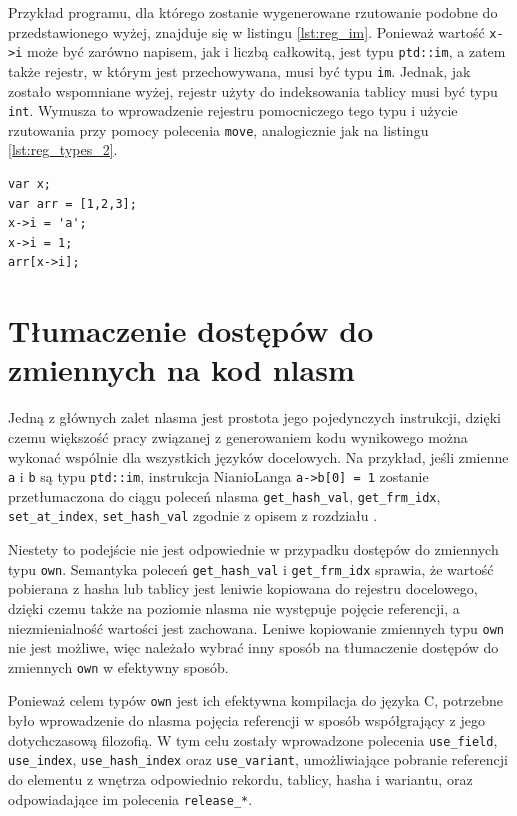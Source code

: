 \documentclass[licencjacka]{pracamgr}
\begin{document}
Przykład programu, dla którego zostanie wygenerowane rzutowanie podobne do przedstawionego wyżej,
znajduje się w listingu \ref{lst:reg_im}.
Ponieważ wartość \texttt{x->i} może być zarówno napisem, jak i liczbą całkowitą, jest typu \texttt{ptd::im},
a zatem także rejestr, w którym jest przechowywana, musi być typu \texttt{im}.
Jednak, jak zostało wspomniane wyżej, rejestr użyty do indeksowania tablicy musi być typu \texttt{int}.
Wymusza to wprowadzenie rejestru pomocniczego tego typu i użycie rzutowania przy pomocy polecenia \texttt{move},
analogicznie jak na listingu \ref{lst:reg_types_2}.
\begin{minipage}{\linewidth}
\begin{lstlisting}[caption={Indeksowanie tablicy zmienną typu \texttt{ptd::im}},label={lst:reg_im},language=nl]
var x;
var arr = [1,2,3];
x->i = 'a';
x->i = 1;
arr[x->i];
\end{lstlisting}
\end{minipage}

\section{Tłumaczenie dostępów do zmiennych na kod nlasm}
Jedną z głównych zalet nlasma jest prostota jego pojedynczych instrukcji, dzięki czemu większość
pracy związanej z generowaniem kodu wynikowego można wykonać wspólnie dla wszystkich języków docelowych.
Na przykład, jeśli zmienne \texttt{a} i \texttt{b} są typu \texttt{ptd::im}, instrukcja NianioLanga
\texttt{a->b[0] = 1} zostanie przetłumaczona do ciągu poleceń nlasma
\texttt{get\_hash\_val}, \texttt{get\_frm\_idx}, \texttt{set\_at\_index}, \texttt{set\_hash\_val} zgodnie
z opisem z rozdziału \textit{}.

Niestety to podejście nie jest odpowiednie w przypadku dostępów do zmiennych typu \texttt{own}.
Semantyka poleceń \texttt{get\_hash\_val} i \texttt{get\_frm\_idx} sprawia, że wartość pobierana
z hasha lub tablicy jest leniwie kopiowana do rejestru docelowego, dzięki czemu także na poziomie nlasma
nie występuje pojęcie referencji, a niezmienialność wartości jest zachowana.
Leniwe kopiowanie zmiennych typu \texttt{own} nie jest możliwe, więc należało wybrać inny sposób na
tłumaczenie dostępów do zmiennych \texttt{own} w efektywny sposób.

Ponieważ celem typów \texttt{own} jest ich efektywna kompilacja do języka C, potrzebne było
wprowadzenie do nlasma pojęcia referencji w sposób współgrający z jego dotychczasową filozofią.
W tym celu zostały wprowadzone polecenia \texttt{use\_field}, \texttt{use\_index}, \texttt{use\_hash\_index} oraz
\texttt{use\_variant}, umożliwiające pobranie referencji do elementu z wnętrza odpowiednio rekordu, tablicy, hasha
i wariantu, oraz odpowiadające im polecenia \texttt{release\_*}.
\end{document}
